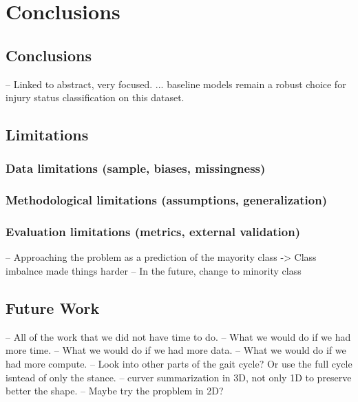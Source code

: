 \chapter{Conclusions}\label{chap:conclusions}

\section{Conclusions}\label{sec:conc-conclusions}
-- Linked to abstract, very focused.
... baseline models remain a robust choice for injury status classification on this dataset.

\section{Limitations}\label{sec:conc-limitations}

\subsection{Data limitations (sample, biases, missingness)}\label{sec:limitations-data}

\subsection{Methodological limitations (assumptions, generalization)}\label{sec:limitations-methods}

\subsection{Evaluation limitations (metrics, external validation)}\label{sec:limitations-evaluation}
-- Approaching the problem as a prediction of the mayority class -> Class imbalnce made things harder
    -- In the future, change to minority class

\section{Future Work}\label{sec:conc-future-work}
-- All of the work that we did not have time to do.
-- What we would do if we had more time.
-- What we would do if we had more data.
-- What we would do if we had more compute.
-- Look into other parts of the gait cycle? Or use the full cycle isntead of only the stance.
-- curver summarization in 3D, not only 1D to preserve better the shape.
-- Maybe try the propblem in 2D?
